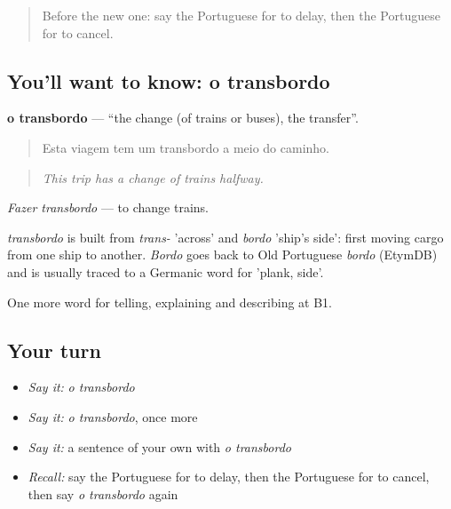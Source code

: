 \label{lesson:PT-C416-transbordo}



\begin{quote}
Before the new one: say the Portuguese for to delay, then the Portuguese for to cancel.
\end{quote}

\subsection*{You'll want to know: o transbordo}
\textbf{o transbordo} — \textquotedblleft{}the change (of trains or buses), the transfer\textquotedblright{}.

\begin{quote}
Esta viagem tem um transbordo a meio do caminho.
\end{quote}

\begin{quote}
\emph{This trip has a change of trains halfway.}
\end{quote}

\emph{Fazer transbordo} — to change trains.

\begin{cousinweb}
\emph{transbordo} is built from \emph{trans-} 'across' and \emph{bordo} 'ship's side': first moving cargo from one ship to another. \emph{Bordo} goes back to Old Portuguese \emph{bordo} (EtymDB) and is usually traced to a Germanic word for 'plank, side'.
\end{cousinweb}

\begin{grammarlens}[title={What you've built}]
One more word for telling, explaining and describing at B1.
\end{grammarlens}

\subsection*{Your turn}
\begin{itemize}
\raggedright
  \item \emph{Say it:} \emph{o transbordo}
  \item \emph{Say it:} \emph{o transbordo}, once more
  \item \emph{Say it:} a sentence of your own with \emph{o transbordo}
  \item \emph{Recall:} say the Portuguese for to delay, then the Portuguese for to cancel, then say \emph{o transbordo} again
\end{itemize}

